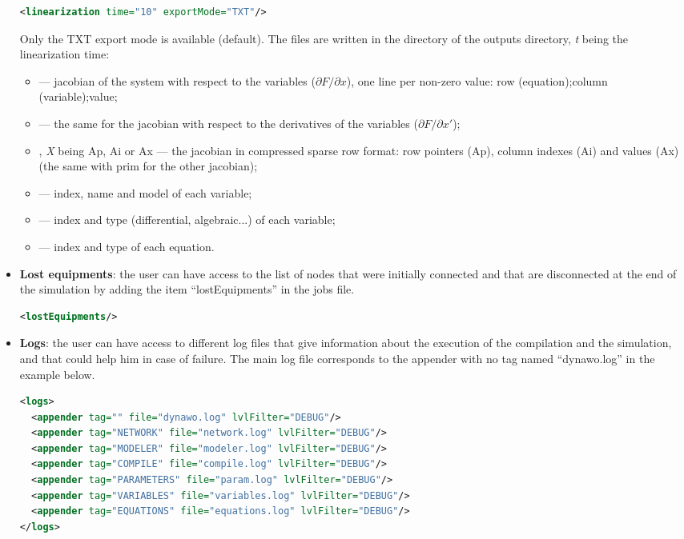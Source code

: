 \documentclass[a4paper, 12pt]{report}
\begin{document}
\begin{itemize}
\begin{lstlisting}[language=XML, morekeywords={linearization},numbers=none]
<linearization time="10" exportMode="TXT"/>
\end{lstlisting}
Only the TXT export mode is available (default). The files are written in the  directory of the outputs directory, \textit{t} being the linearization time:
\begin{itemize}
  \item {} — jacobian of the system with respect to the variables ($\partial F / \partial x$), one line per non-zero value: row (equation);column (variable);value;
  \item {} — the same for the jacobian with respect to the derivatives of the variables ($\partial F / \partial x'$);
  \item {}, \textit{X} being Ap, Ai or Ax — the jacobian in compressed sparse row format: row pointers (Ap), column indexes (Ai) and values (Ax) (the same with prim for the other jacobian);
  \item {} — index, name and model of each variable;
  \item {} — index and type (differential, algebraic...) of each variable;
  \item {} — index and type of each equation.
\end{itemize}

\item \textbf{Lost equipments}:  the user can have access to the list of nodes that were initially connected and that are disconnected at the end of the simulation by adding the item ``lostEquipments'' in the jobs file.

\begin{lstlisting}[language=XML, morekeywords={lostEquipments},numbers=none]
<lostEquipments/>
\end{lstlisting}

\item \textbf{Logs}: the user can have access to different log files that give information about the execution of the compilation and the simulation, and that could help him in case of failure. The main log file corresponds to the appender with no tag named ``dynawo.log'' in the example below.
\begin{lstlisting}[language=XML, morekeywords={logs}]
<logs>
  <appender tag="" file="dynawo.log" lvlFilter="DEBUG"/>
  <appender tag="NETWORK" file="network.log" lvlFilter="DEBUG"/>
  <appender tag="MODELER" file="modeler.log" lvlFilter="DEBUG"/>
  <appender tag="COMPILE" file="compile.log" lvlFilter="DEBUG"/>
  <appender tag="PARAMETERS" file="param.log" lvlFilter="DEBUG"/>
  <appender tag="VARIABLES" file="variables.log" lvlFilter="DEBUG"/>
  <appender tag="EQUATIONS" file="equations.log" lvlFilter="DEBUG"/>
</logs>
\end{lstlisting}


\end{itemize}
\end{document}
